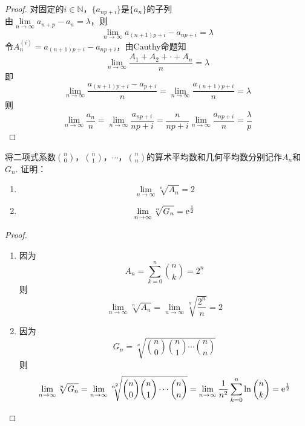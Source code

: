 \begin{proof}
    
    对固定的$i \in \mathbb{N}$，$\{a_{np + i}\}$是$\{a_{n}\}$的子列\\
    由$\lim\limits_{n\to\infty}{a_{n+p} - a_n} = \lambda$，则
    $$\lim\limits_{n\to\infty}{a_{(n+1)p + i} - a_{np+i}} = \lambda$$
    令$A^{(i)}_{n} = a_{(n+1)p+i} - a_{np + i}$，由\textup{Cauthy}命题知
    $$\lim\limits_{n\to\infty}{\dfrac{A_1 + A_2 + \cdot + A_n}{n}} = \lambda$$
    即
    $$\lim\limits_{n\to\infty}{\dfrac{a_{(n+1)p+i} - a_{p+i}}{n}} = \lim\limits_{n\to\infty}{\dfrac{a_{(n+1)p+i}}{n}} = \lambda$$
    则
    $$\lim\limits_{n\to\infty}{\dfrac{a_n}{n}} = \lim\limits_{n\to\infty}{\dfrac{a_{np+i}}{np+i}} = \dfrac{n}{np+i} \lim\limits_{n\to\infty}{\dfrac{a_{np+i}}{n}} = \dfrac{\lambda}{p}$$

\end{proof}

\begin{proposition}

    将二项式系数$\binom{n}{0}$，$\binom{n}{1}$，$\cdots$，$\binom{n}{n}$的算术平均数和几何平均数分别记作$A_n$和$G_n$. 证明：

    \begin{enumerate}

        \item $$\lim\limits_{n\to\infty}{\sqrt[n]{A_n}} = 2$$
                
        \item $$\lim\limits_{n\to\infty}{\sqrt[n]{G_n}} = \mathrm{e}^{\frac{1}{2}}$$

    \end{enumerate}

\end{proposition}

\begin{proof}

    \begin{enumerate}
        
        \item 
            因为$$A_n = \sum\limits_{k=0}^{n}{\binom{n}{k}} = 2^n$$则
            $$\lim\limits_{n\to\infty}{\sqrt[n]{A_n}} = \lim\limits_{n\to\infty}{\sqrt[n]{\dfrac{2^n}{n}}} = 2$$

        \item 
            因为$$G_n = \sqrt[n]{\binom{n}{0}\binom{n}{1}\cdots\binom{n}{n}}$$则
            $$\lim\limits_{n\to\infty}{\sqrt[n]{G_n}}  = \lim\limits_{n\to\infty}{\sqrt[n^2]{\binom{n}{0}\binom{n}{1}\cdots\binom{n}{n}}} = \lim\limits_{n\to\infty}{\dfrac{1}{n^2} \sum\limits_{k=0}^{n}{\ln{\binom{n}{k}}}} = \mathrm{e}^{\frac{1}{2}}  $$
    
        \end{enumerate}
    
\end{proof}

